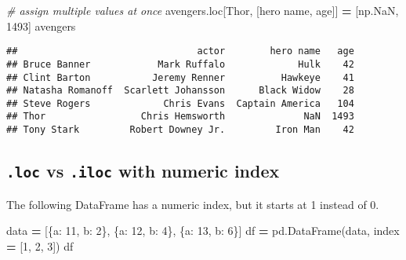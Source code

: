 \documentclass[
]{book}
\newenvironment{Shaded}{\begin{snugshade}}{\end{snugshade}}
\newcommand{\CommentTok}[1]{\textcolor[rgb]{0.56,0.35,0.01}{\textit{#1}}}
\newcommand{\DecValTok}[1]{\textcolor[rgb]{0.00,0.00,0.81}{#1}}
\newcommand{\NormalTok}[1]{#1}
\newcommand{\OperatorTok}[1]{\textcolor[rgb]{0.81,0.36,0.00}{\textbf{#1}}}
\newcommand{\StringTok}[1]{\textcolor[rgb]{0.31,0.60,0.02}{#1}}
\begin{document}
\begin{Shaded}
\begin{Highlighting}[]
\CommentTok{\# assign multiple values at once}
\NormalTok{avengers.loc[}\StringTok{\textquotesingle{}Thor\textquotesingle{}}\NormalTok{, [}\StringTok{\textquotesingle{}hero name\textquotesingle{}}\NormalTok{, }\StringTok{\textquotesingle{}age\textquotesingle{}}\NormalTok{]] }\OperatorTok{=}\NormalTok{ [np.NaN, }\DecValTok{1493}\NormalTok{]}
\NormalTok{avengers}
\end{Highlighting}
\end{Shaded}

\begin{verbatim}
##                                actor        hero name   age
## Bruce Banner            Mark Ruffalo             Hulk    42
## Clint Barton           Jeremy Renner          Hawkeye    41
## Natasha Romanoff  Scarlett Johansson      Black Widow    28
## Steve Rogers             Chris Evans  Captain America   104
## Thor                 Chris Hemsworth              NaN  1493
## Tony Stark         Robert Downey Jr.         Iron Man    42
\end{verbatim}

\hypertarget{loc-vs-.iloc-with-numeric-index}{%
\subsection{\texorpdfstring{\texttt{.loc} vs \texttt{.iloc} with numeric index}{.loc vs .iloc with numeric index}}\label{loc-vs-.iloc-with-numeric-index}}

The following DataFrame has a numeric index, but it starts at 1 instead of 0.

\begin{Shaded}
\begin{Highlighting}[]
\NormalTok{data }\OperatorTok{=}\NormalTok{ [\{}\StringTok{\textquotesingle{}a\textquotesingle{}}\NormalTok{: }\DecValTok{11}\NormalTok{, }\StringTok{\textquotesingle{}b\textquotesingle{}}\NormalTok{: }\DecValTok{2}\NormalTok{\},}
\NormalTok{\{}\StringTok{\textquotesingle{}a\textquotesingle{}}\NormalTok{: }\DecValTok{12}\NormalTok{, }\StringTok{\textquotesingle{}b\textquotesingle{}}\NormalTok{: }\DecValTok{4}\NormalTok{\},}
\NormalTok{\{}\StringTok{\textquotesingle{}a\textquotesingle{}}\NormalTok{: }\DecValTok{13}\NormalTok{, }\StringTok{\textquotesingle{}b\textquotesingle{}}\NormalTok{: }\DecValTok{6}\NormalTok{\}]}
\NormalTok{df }\OperatorTok{=}\NormalTok{ pd.DataFrame(data, index }\OperatorTok{=}\NormalTok{ [}\DecValTok{1}\NormalTok{, }\DecValTok{2}\NormalTok{, }\DecValTok{3}\NormalTok{])}
\NormalTok{df}
\end{Highlighting}
\end{Shaded}
\end{document}
